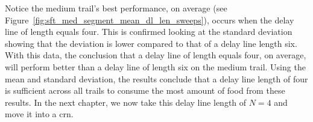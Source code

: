 Notice the medium trail's best performance, on average (see Figure~\ref{fig:sft_med_segment_mean_dl_len_sweeps}), occurs when the delay line of length equals four. This is confirmed looking at the standard deviation showing that the deviation is lower compared to that of a delay line length six. With this data, the conclusion that a delay line of length equals four, on average, will perform better than a delay line of length six on the medium trail. Using the mean and standard deviation, the results conclude that a delay line length of four is sufficient across all trails to consume the most amount of food from these results. In the next chapter, we now take this delay line length of $N=4$ and move it into a \gls{crn}.
